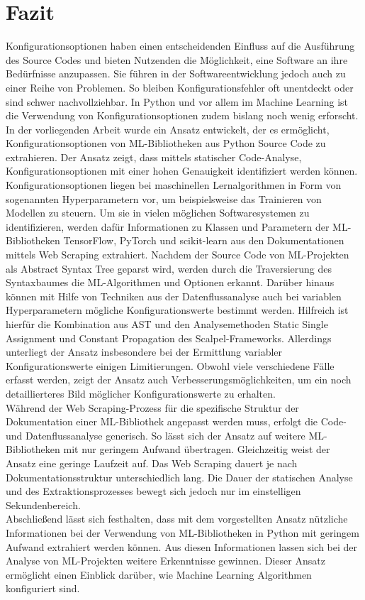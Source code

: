 \documentclass[german,bachelor]{swsLeipzig}
\begin{document}
\chapter{Fazit}\label{Fazit}
Konfigurationsoptionen haben einen entscheidenden Einfluss auf die Ausführung des Source Codes und bieten Nutzenden
die Möglichkeit, eine Software an ihre Bedürfnisse anzupassen.
Sie führen in der Softwareentwicklung jedoch auch zu einer Reihe von Problemen.
So bleiben Konfigurationsfehler oft unentdeckt oder sind schwer nachvollziehbar.
In Python und vor allem im Machine Learning ist die Verwendung von Konfigurationsoptionen zudem bislang noch wenig erforscht.
In der vorliegenden Arbeit wurde ein Ansatz entwickelt, der es ermöglicht, Konfigurationsoptionen von ML-Bibliotheken
aus Python Source Code zu extrahieren.
Der Ansatz zeigt, dass mittels statischer Code-Analyse, Konfigurationsoptionen mit einer hohen Genauigkeit identifiziert werden
können.\\
\indent Konfigurationsoptionen liegen bei maschinellen Lernalgorithmen in Form von sogenannten Hyperparametern vor, um beispielsweise
das Trainieren von Modellen zu steuern.
Um sie in vielen möglichen Softwaresystemen zu identifizieren, werden dafür Informationen zu Klassen und Parametern der
ML-Bibliotheken TensorFlow, PyTorch und scikit-learn aus den Dokumentationen mittels Web Scraping extrahiert.
Nachdem der Source Code von ML-Projekten als Abstract Syntax Tree geparst wird, werden durch die Traversierung des Syntaxbaumes
die ML-Algorithmen und Optionen erkannt.
Darüber hinaus können mit Hilfe von Techniken aus der Datenflussanalyse auch bei variablen Hyperparametern
mögliche Konfigurationswerte bestimmt werden.
Hilfreich ist hierfür die Kombination aus AST und den Analysemethoden Static Single Assignment und Constant Propagation
des Scalpel-Frameworks.
Allerdings unterliegt der Ansatz insbesondere bei der Ermittlung variabler Konfigurationswerte einigen Limitierungen.
Obwohl viele verschiedene Fälle erfasst werden, zeigt der Ansatz auch Verbesserungsmöglichkeiten, um ein noch
detaillierteres Bild möglicher Konfigurationswerte zu erhalten.\\
\indent Während der Web Scraping-Prozess für die spezifische Struktur der Dokumentation einer ML-Bibliothek angepasst werden muss,
erfolgt die Code- und Datenflussanalyse generisch.
So lässt sich der Ansatz auf weitere ML-Bibliotheken mit nur geringem Aufwand übertragen.
Gleichzeitig weist der Ansatz eine geringe Laufzeit auf.
Das Web Scraping dauert je nach Dokumentationsstruktur unterschiedlich lang.
Die Dauer der statischen Analyse und des Extraktionsprozesses bewegt sich jedoch nur im einstelligen Sekundenbereich.\\
\indent Abschließend lässt sich festhalten, dass mit dem vorgestellten Ansatz nützliche Informationen bei der Verwendung
von ML-Bibliotheken in Python mit geringem Aufwand extrahiert werden können.
Aus diesen Informationen lassen sich bei der Analyse von ML-Projekten weitere Erkenntnisse gewinnen.
Dieser Ansatz ermöglicht einen Einblick darüber, wie Machine Learning Algorithmen konfiguriert sind.
\end{document}
